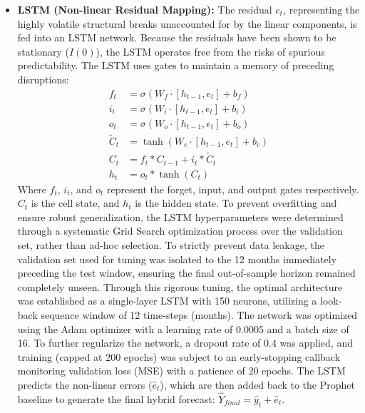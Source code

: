 \documentclass[12pt, letterpaper]{article}
\begin{document}
\begin{itemize}
    \item \textbf{LSTM (Non-linear Residual Mapping):} The residual $e_t$, representing the highly volatile structural breaks unaccounted for by the linear components, is fed into an LSTM network. Because the residuals have been shown to be stationary ($I(0)$), the LSTM operates free from the risks of spurious predictability. The LSTM uses gates to maintain a memory of preceding disruptions:
    \begin{align}
        f_t &= \sigma(W_f \cdot [h_{t-1}, e_t] + b_f) \\
        i_t &= \sigma(W_i \cdot [h_{t-1}, e_t] + b_i) \\
        o_t &= \sigma(W_o \cdot [h_{t-1}, e_t] + b_o) \\
        \tilde{C}_t &= \tanh(W_c \cdot [h_{t-1}, e_t] + b_c) \\
        C_t &= f_t \ast C_{t-1} + i_t \ast \tilde{C}_t \\
        h_t &= o_t \ast \tanh(C_t)
    \end{align}
    Where $f_t$, $i_t$, and $o_t$ represent the forget, input, and output gates respectively. $C_t$ is the cell state, and $h_t$ is the hidden state. To prevent overfitting and ensure robust generalization, the LSTM hyperparameters were determined through a systematic Grid Search optimization process over the validation set, rather than ad-hoc selection. To strictly prevent data leakage, the validation set used for tuning was isolated to the 12 months immediately preceding the test window, ensuring the final out-of-sample horizon remained completely unseen. Through this rigorous tuning, the optimal architecture was established as a single-layer LSTM with 150 neurons, utilizing a look-back sequence window of 12 time-steps (months). The network was optimized using the Adam optimizer with a learning rate of 0.0005 and a batch size of 16. To further regularize the network, a dropout rate of 0.4 was applied, and training (capped at 200 epochs) was subject to an early-stopping callback monitoring validation loss (MSE) with a patience of 20 epochs. The LSTM predicts the non-linear errors ($\hat{e}_t$), which are then added back to the Prophet baseline to generate the final hybrid forecast: $\hat{Y}_{final} = \hat{y}_t + \hat{e}_t$.
\end{itemize}
\end{document}
